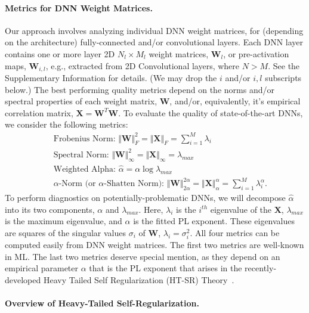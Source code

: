 \documentclass{article}
\begin{document}
\paragraph{Metrics for DNN Weight Matrices.}

Our approach involves analyzing individual DNN weight matrices, for (depending on the architecture) fully-connected and/or convolutional layers.
Each DNN layer contains one or more layer 2D  $N_{l}\times M_{l}$ weight matrices, $\mathbf{W}_{l}$, or pre-activation maps, $\mathbf{W}_{i,l}$, e.g., extracted from 2D Convolutional layers, where $N > M$.
See the Supplementary Information
for details.
(We may drop the $i$ and/or $i,l$ subscripts below.)
The best performing quality metrics depend on the norms and/or spectral properties of each weight matrix,
$\mathbf{W}$, and/or, equivalently, it's empirical correlation matrix, $\mathbf{X}=\mathbf{W}^{T}\mathbf{W}$.
To evaluate the quality of state-of-the-art DNNs, 
we consider the following metrics:
\begin{eqnarray}
& & \text{Frobenius Norm: $\Vert\mathbf{W}\Vert^{2}_{F}=\Vert\mathbf{X}\Vert_{F}=\sum\nolimits_{i=1}^{M} \lambda_{i}$ } \\
& & \text{Spectral Norm: $\Vert\mathbf{W}\Vert_{\infty}^{2}=\Vert\mathbf{X}\Vert_{\infty}=\lambda_{max}$ } \\
& & \text{Weighted Alpha: $\hat{\alpha}=\alpha\log\lambda_{max}$ } \\
& & \text{$\alpha$-Norm (or $\alpha$-Shatten Norm): $\Vert\mathbf{W}\Vert^{2\alpha}_{2\alpha}=\Vert\mathbf{X}\Vert^{\alpha}_{\alpha}=\sum\nolimits_{i=1}^{M}\lambda_{i}^{\alpha}$. }
\end{eqnarray}
To perform diagnostics on potentially-problematic DNNs,
we will decompose $\hat{\alpha}$ into its two components, $\alpha$ and $\lambda_{max}$.
Here, $\lambda_{i}$ is the $i^{th}$ eigenvalue of the $\mathbf{X}$, $\lambda_{max}$ is the maximum eigenvalue, and $\alpha$ is the fitted PL exponent. 
These eigenvalues are squares of the singular values $\sigma_{i}$ of $\mathbf{W}$, $\lambda_{i}=\sigma^{2}_{i}$.
All four metrics can be computed easily from DNN weight matrices.
The first two metrics are well-known in ML.
The last two metrics deserve special mention, as they depend on an empirical parameter $\alpha$ that is the PL exponent that arises in the recently-developed Heavy Tailed Self Regularization (HT-SR) Theory~\cite{MM18_TR, MM19_HTSR_ICML, MM20_SDM}.


\paragraph{Overview of Heavy-Tailed Self-Regularization.}
\end{document}
